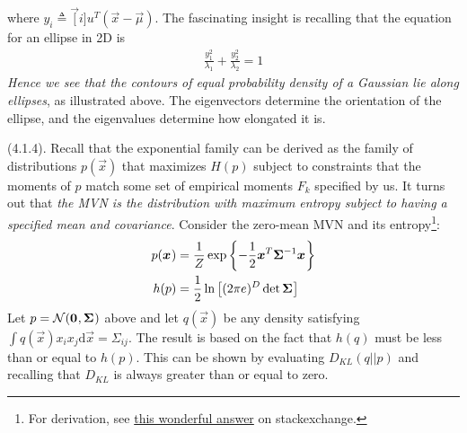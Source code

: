 \documentclass[11pt]{article}
\begin{document}
\myspace{}
where $y_i \triangleq \vec[i]{u}^T (\vec x - \vec\mu)$. The fascinating insight is recalling that the equation for an ellipse in 2D is 
\begin{align}
	\frac{y_1^2}{\lambda_1} + \frac{y_2^2}{\lambda_2} = 1
\end{align}
\textit{Hence we see that the contours of equal probability density of a Gaussian lie along ellipses}, as illustrated above. The eigenvectors determine the orientation of the ellipse, and the eigenvalues determine how elongated it is. 

\myspace
\p {} (4.1.4). Recall that the exponential family can be derived as the family of distributions $p(\vec x)$ that maximizes $H(p)$ subject to constraints that the moments of $p$ match some set of empirical moments $F_k$ specified by us. It turns out that \textit{the MVN is the distribution with maximum entropy subject to having a specified mean and covariance}. Consider the zero-mean MVN and its entropy\footnote{For derivation, see \href{https://math.stackexchange.com/a/650281}{this wonderful answer} on stackexchange.}:
\begin{align}
	p(\bm{x}_{})
		&= \frac{1}{Z} \exp\left\{ - \frac{1}{2} \bm{x}_{}^T \bm{\Sigma}_{}^{-1} \bm{x}_{}  \right\} \\
	h(p)
		&= \frac{1}{2} \ln \left[  (2\pi e)^D \det \bm{\Sigma}_{}   \right]
\end{align}
Let $p = \mathcal{N}(\bm{0}_{}, \bm{\Sigma}_{})$ above and let $q(\vec x)$ be any density satisfying $\int q(\vec x) x_i x_j \mathrm{d}\vec x = \Sigma_{ij}$. The result is based on the fact that $h(q)$ must be less than or equal to $h(p)$. This can be shown by evaluating $D_{KL}(q || p)$ and recalling that $D_{KL}$ is always greater than or equal to zero. 
\end{document}
